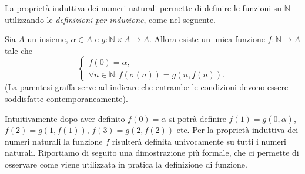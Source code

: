 \documentclass[italian,a4paper,hidelinks,headinclude]{scrartcl}
\newcommand{\NN}{{\mathbb N}}
\begin{document}
La proprietà induttiva dei numeri naturali permette di definire le funzioni su
$\NN$ utilizzando le \emph{definizioni per induzione}, come nel seguente.
%
\begin{theorem}\label{th:def_induction}
Sia $A$ un insieme, $\alpha \in A$ e $g\colon \NN\times A \to A$.
Allora esiste un unica funzione $f\colon \NN \to A$ tale che
\begin{equation}\label{eq:485452}
\begin{cases}
  f(0) = \alpha,\\
  \forall n\in \NN\colon f(\sigma(n)) = g(n, f(n)).
\end{cases}
\end{equation}
(La parentesi graffa serve ad indicare che entrambe le condizioni devono
essere soddisfatte contemporaneamente).
\end{theorem}
%
Intuitivamente dopo aver definito $f(0) = \alpha$ si potrà definire
$f(1) = g(0, \alpha)$, $f(2) = g(1, f(1))$, $f(3) = g(2, f(2))$ etc.
Per la proprietà induttiva dei numeri naturali la funzione $f$ risulterà
definita univocamente su tutti i numeri naturali.
Riportiamo di seguito una dimostrazione più formale, che ci permette di
osservare come viene utilizzata in pratica la definizione di funzione.
%
\end{document}
